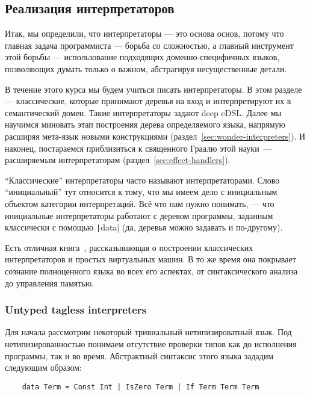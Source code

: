 
\subsection{Реализация интерпретаторов}

Итак, мы определили, что интерпретаторы --- это основа основ, потому что главная задача программиста --- борьба со сложностью, а главный инструмент этой борьбы --- использование подходящих доменно-специфичных языков, позволяющих думать только о важном, абстрагируя несущественные детали.

В течение этого курса мы будем учиться писать интерпретаторы.
В этом разделе --- классические, которые принимают деревья на вход и интерпретируют их в семантический домен.
Такие интерпретаторы задают deep eDSL\@.
Далее мы научимся миновать этап построения дерева определяемого языка, напрямую расширяя мета-язык новыми конструкциями (раздел~\ref{sec:wonder-interpreters}).
И наконец, постараемся приблизиться к священного Граалю этой науки~--- расширяемым интерпретаторам (раздел~\ref{sec:effect-handlers}).

``Классические'' интерпретаторы часто называют  интерпретаторами.
Слово ``инициальный'' тут относится к тому, что мы имеем дело с инициальным объектом категории интерпретаций.
Всё что нам нужно понимать, --- что инициальные интерпретаторы работают с деревом программы, заданным классически с помощью \texttt|data| (да, деревья можно задавать и по-другому).

Есть отличная книга~\cite{nystrom2021crafting}, рассказывающая о построении классических интерпретаторов и простых виртуальных машин.
В то же время она покрывает сознание полноценного языка во всех его аспектах, от синтаксического анализа до управления памятью.

\subsubsection{Untyped tagless interpreters}

Для начала рассмотрим некоторый тривиальный нетипизироватный язык.
Под нетипизированностью понимаем отсутствие проверки типов как до исполнения программы, так и во время.
Абстрактный синтаксис этого языка зададим следующим образом:
\begin{verbatim}
    data Term = Const Int | IsZero Term | If Term Term Term
\end{verbatim}

